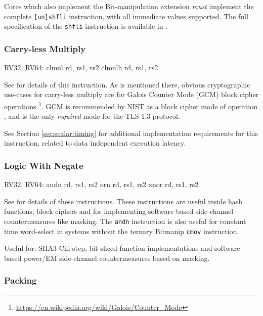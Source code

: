 Cores which also implement the Bit-manipulation extension {\em must}
implement the complete {\tt [un]shfli} instruction, with all immediate values
supported.
The full specification of the {\tt shfli} instruction is available in
\cite[Section 2.2.3]{riscv:bitmanip:draft}.

\subsubsection{Carry-less Multiply}

\begin{cryptobitmanipisa}
RV32, RV64:
    clmul  rd, rs1, rs2
    clmulh rd, rs1, rs2
\end{cryptobitmanipisa}

See \cite[Section 2.6]{riscv:bitmanip:draft} for details of
this instruction.
As is mentioned there, obvious cryptographic use-cases for carry-less
multiply are for Galois Counter Mode (GCM) block cipher operations
\footnote{\url{https://en.wikipedia.org/wiki/Galois/Counter_Mode}}.
GCM is recommended by NIST as a block cipher mode of operation
\cite{nist:gcm}, and is the only {\em required} mode for the TLS 1.3
protocol.

See Section \ref{sec:scalar:timing} for additional implementation
requirements for this instruction, related to data independent
execution latency.

\subsubsection{Logic With Negate}

\begin{cryptobitmanipisa}
RV32, RV64:
    andn rd, rs1, rs2
     orn rd, rs1, rs2
    xnor rd, rs1, rs2
\end{cryptobitmanipisa}

See \cite[Section 2.1.3]{riscv:bitmanip:draft} for details of
these instructions.
These instructions are useful inside hash functions, block ciphers and
for implementing software based side-channel countermeasures like masking.
The {\tt andn} instruction is also useful for constant time word-select
in systems without the ternary Bitmanip {\tt cmov} instruction.

Useful for:
SHA3 Chi step,
bit-sliced function implementations
and
software based power/EM side-channel countermeasures based on masking.

\subsubsection{Packing}


